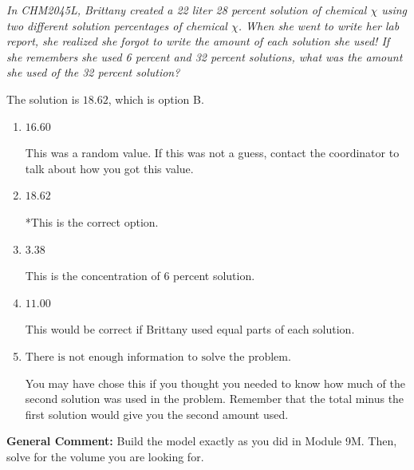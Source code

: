 \documentclass{extbook}[14pt]
\begin{document}
\begin{enumerate}
{\begin{center}
    \textit{ In CHM2045L, Brittany created a 22 liter 28 percent solution of chemical $\chi$ using two different solution percentages of chemical $\chi$. When she went to write her lab report, she realized she forgot to write the amount of each solution she used! If she remembers she used 6 percent and 32 percent solutions, what was the amount she used of the 32 percent solution? }
\end{center}


The solution is \( 18.62 \), which is option B.\begin{enumerate}[label=\Alph*.]
\item \( 16.60 \)

This was a random value. If this was not a guess, contact the coordinator to talk about how you got this value.
\item \( 18.62 \)

*This is the correct option.
\item \( 3.38 \)

This is the concentration of 6 percent solution.
\item \( 11.00 \)

This would be correct if Brittany used equal parts of each solution.
\item \( \text{There is not enough information to solve the problem.} \)

You may have chose this if you thought you needed to know how much of the second solution was used in the problem. Remember that the total minus the first solution would give you the second amount used.
\end{enumerate}

\textbf{General Comment:} Build the model exactly as you did in Module 9M. Then, solve for the volume you are looking for.
}
\end{enumerate}
\end{document}

